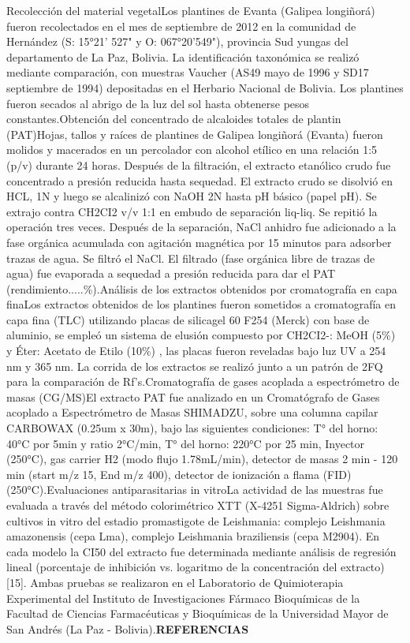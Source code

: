 \documentclass{article}
\begin{document}
{}{Recolección del material vegetal}{Los plantines de Evanta (Galipea longiñorá) fueron recolectados en el mes de septiembre de 2012 en la comunidad de Hernández (S: 15°21' 527" y O: 067°20'549"), provincia Sud yungas del departamento de La Paz, Bolivia. La identificación taxonómica se realizó mediante comparación, con muestras Vaucher (AS49 mayo de 1996 y SD17 septiembre de 1994) depositadas en el Herbario Nacional de Bolivia. Los plantines fueron secados al abrigo de la luz del sol hasta obtenerse pesos constantes.}{Obtención del concentrado de alcaloides totales de plantin (PAT)}{Hojas, tallos y raíces de plantines de Galipea longiñorá (Evanta) fueron molidos y macerados en un percolador con alcohol etílico en una relación 1:5 (p/v) durante 24 horas. Después de la filtración, el extracto etanólico crudo fue concentrado a presión reducida hasta sequedad. El extracto crudo se disolvió en HCL, 1N y luego se alcalinizó con NaOH 2N hasta pH básico (papel pH). Se extrajo contra CH2CI2 v/v 1:1 en embudo de separación liq-liq. Se repitió la operación tres veces. Después de la separación, NaCl anhidro fue adicionado a la fase orgánica acumulada con agitación magnética por 15 minutos para adsorber trazas de agua. Se filtró el NaCl. El filtrado (fase orgánica libre de trazas de agua) fue evaporada a sequedad a presión reducida para dar el PAT (rendimiento.....\%).}{Análisis de los extractos obtenidos por cromatografía en capa fina}{Los extractos obtenidos de los plantines fueron sometidos a cromatografía en capa fina (TLC) utilizando placas de silicagel 60 F254 (Merck) con base de aluminio, se empleó un sistema de elusión compuesto por CH2CI2-: MeOH (5\%) y Éter: Acetato de Etilo (10\%) , las placas fueron reveladas bajo luz UV a 254 nm y 365 nm. La corrida de los extractos se realizó junto a un patrón de 2FQ para la comparación de Rf's.}{Cromatografía de gases acoplada a espectrómetro de masas (CG/MS)}{El extracto PAT fue analizado en un Cromatógrafo de Gases acoplado a Espectrómetro de Masas SHIMADZU, sobre una columna capilar CARBOWAX (0.25um x 30m), bajo las siguientes condiciones: T° del horno: 40°C por 5min y ratio 2°C/min, T° del horno: 220°C por 25 min, Inyector (250°C), gas carrier H2 (modo flujo 1.78mL/min), detector de masas 2 min - 120 min (start m/z 15, End m/z 400), detector de ionización a flama (FID) (250°C).}{Evaluaciones antiparasitarias in vitro}{La actividad de las muestras fue evaluada a través del método colorimétrico XTT (X-4251 Sigma-Aldrich) sobre cultivos in vitro del estadio promastigote de Leishmania: complejo Leishmania amazonensis (cepa Lma), complejo Leishmania braziliensis (cepa M2904). En cada modelo la CI50 del extracto fue determinada mediante análisis de regresión lineal (porcentaje de inhibición vs. logaritmo de la concentración del extracto) [15]. Ambas pruebas se realizaron en el Laboratorio de Quimioterapia Experimental del Instituto de Investigaciones Fármaco Bioquímicas de la Facultad de Ciencias Farmacéuticas y Bioquímicas de la Universidad Mayor de San Andrés (La Paz - Bolivia).}{\textbf{REFERENCIAS}
}
\end{document}
